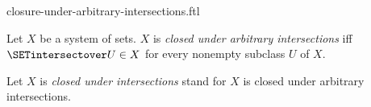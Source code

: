 \documentclass{naproche-library}
\begin{document}
\begin{smodule}[title=Closure Under Arbitrary Intersections]{closure-under-arbitrary-intersections.ftl}

\begin{definition}[forthel,id=FOUNDATIONS_14_2369621166391296]
  Let $X$ be a system of sets.
  $X$ is \emph{closed under arbitrary intersections} iff $\SETintersectover U \in X$ for every nonempty subclass $U$ of $X$.

  Let $X$ is \emph{closed under intersections} stand for $X$ is closed under arbitrary intersections.
\end{definition}
\end{smodule}
\end{document}
